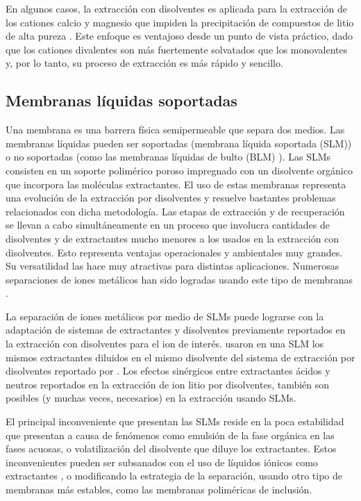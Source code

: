 En algunos casos, la extracción con disolventes es aplicada para la extracción de los cationes calcio y magnesio que impiden la precipitación de compuestos de litio de alta pureza \citep{Shi2020b}. Este enfoque es ventajoso desde un punto de vista práctico, dado que los cationes divalentes son más fuertemente solvatados que los monovalentes y, por lo tanto, su proceso de extracción es más rápido y sencillo.

\subsection{Membranas líquidas soportadas}
Una membrana es una barrera física semipermeable que separa dos medios. Las membranas líquidas pueden ser soportadas (membrana líquida soportada (SLM)) o no soportadas (como las membranas líquidas de bulto (BLM) ). Las \ac{SLM}s consisten en un soporte polimérico poroso impregnado con un disolvente orgánico que incorpora las moléculas extractantes. El uso de estas membranas representa una evolución de la extracción por disolventes y resuelve bastantes problemas relacionados con dicha metodología. Las etapas de extracción y de recuperación se llevan a cabo simultáneamente en un proceso que involucra cantidades de disolventes y de extractantes mucho menores a los usados en la extracción con disolventes. Esto representa ventajas operacionales y ambientales muy grandes. Su versatilidad las hace muy atractivas para distintas aplicaciones. Numerosas separaciones de iones metálicos han sido logradas usando este tipo de membranas \citep{deGyves1999}.

La separación de iones metálicos por medio de \ac{SLM}s puede lograrse con la adaptación de sistemas de extractantes y disolventes previamente reportados en la extracción con disolventes para el ion de interés. \citet{Ma2000} usaron en una \ac{SLM} los mismos extractantes diluidos en el mismo disolvente del sistema de extracción por disolventes reportado por \citet{Kunugita1989}. Los efectos sinérgicos entre extractantes ácidos y neutros reportados en la extracción de ion litio por disolventes, también son posibles (y muchas veces, necesarios) en la extracción usando \ac{SLM}s.

El principal inconveniente que presentan las \ac{SLM}s reside en la poca estabilidad que presentan a causa de fenómenos como emulsión de la fase orgánica en las fases acuosas, o volatilización del disolvente que diluye los extractantes. Estos inconvenientes pueden ser subsanados con el uso de líquidos iónicos como extractantes \citep{ZANTE2019}, o modificando la estrategia de la separación, usando otro tipo de membranas más estables, como las membranas poliméricas de inclusión.


